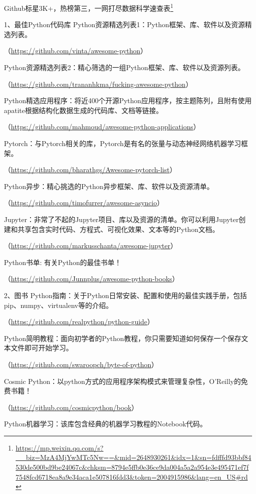 \documentclass[]{ctexbook}
\renewcommand{\href}[2]{#2\footnote{\url{#1}}}
\begin{document}
\href{https://mp.weixin.qq.com/s?__biz=MzA4MjYwMTc5Nw==\&mid=2648930261\&idx=1\&sn=fdfffd93bbf84530de500bd9be24067c\&chksm=8794e5ffb0e36ce9da004a5a2a954e3e495471ef7f7548fcd6718ea8a9e34aca1e507816fdd3\&token=2004915986\&lang=en_US\#rd}{Github标星3K+，热榜第三，一网打尽数据科学速查表}

1、最佳Python代码库
Python资源精选列表1：Python框架、库、软件以及资源精选列表。

（\url{https://github.com/vinta/awesome-python}）

Python资源精选列表2：精心筛选的一组Python框架、库、软件以及资源列表。

（\url{https://github.com/trananhkma/fucking-awesome-python}）

Python精选应用程序：将近400个开源Python应用程序，按主题陈列，且附有使用apatite根据结构化数据生成的代码库、文档等链接。

（\url{https://github.com/mahmoud/awesome-python-applications}）

Pytorch：与Pytorch相关的库，Pytorch是有名的张量与动态神经网络机器学习框架。

（\url{https://github.com/bharathgs/Awesome-pytorch-list}）

Python异步：精心挑选的Python异步框架、库、软件以及资源清单。

（\url{https://github.com/timofurrer/awesome-asyncio}）

Jupyter：非常了不起的Jupyter项目、库以及资源的清单。你可以利用Jupyter创建和共享包含实时代码、方程式、可视化效果、文本等的Python文档。

（\url{https://github.com/markusschanta/awesome-jupyter}）

Python书单: 有关Python的最佳书单！

（\url{https://github.com/Junnplus/awesome-python-books}）

2、图书
Python指南：关于Python日常安装、配置和使用的最佳实践手册，包括pip、numpy、virtualenv等的介绍。

（\url{https://github.com/realpython/python-guide}）

Python简明教程：面向初学者的Python教程，你只需要知道如何保存一个保存文本文件即可开始学习。

（\url{https://github.com/swaroopch/byte-of-python}）

Cosmic Python：以python方式的应用程序架构模式来管理复杂性，O'Reilly的免费书籍！

（\url{https://github.com/cosmicpython/book}）

Python机器学习：该库包含经典的机器学习教程的Notebook代码。
\end{document}
